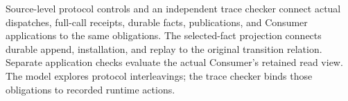 Source-level protocol controls and an independent trace checker connect
actual dispatches, full-call receipts, durable facts, publications, and
Consumer applications to the same obligations. The selected-fact
projection connects durable append, installation, and replay to the
original transition relation. Separate application checks evaluate the
actual Consumer's retained read view. The model explores protocol
interleavings; the trace checker binds those obligations to recorded
runtime actions.

